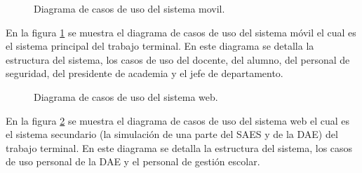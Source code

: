 \begin{figure}[htbp!]
	\begin{center}
		\caption{Diagrama de casos de uso del sistema movil.}
		\label{fig:casosDeUso1}
	\end{center}
\end{figure}
En la figura \ref{fig:casosDeUso1} se muestra el diagrama de casos de uso del sistema móvil el cual es el sistema principal del trabajo terminal. En este diagrama se detalla la estructura del sistema, los casos de uso del docente, del alumno, del personal de seguridad, del presidente de academia y el jefe de departamento.
\begin{figure}[htbp!]
	\begin{center}
		\caption{Diagrama de casos de uso del sistema web.}
		\label{fig:casosDeUso2}
	\end{center}
\end{figure}

En la figura \ref{fig:casosDeUso2} se muestra el diagrama de casos de uso del sistema web el cual es el sistema secundario (la simulación de una parte del SAES y de la DAE) del trabajo terminal. En este diagrama se detalla la estructura del sistema, los casos de uso personal de la DAE y el personal de gestión escolar.

